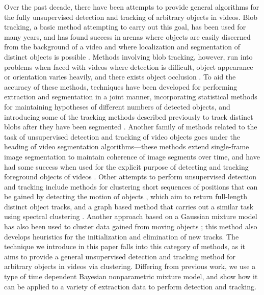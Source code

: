 \documentclass[twocolumn, final]{svjour3}
\begin{document}
Over the past decade, there have been attempts to provide general algorithms for the fully unsupervised detection and tracking of arbitrary objects in videos. Blob tracking, a basic method attempting to carry out this goal, has been used for many years, and has found success in arenas where objects are easily discerned from the background of a video and where localization and segmentation of distinct objects is possible \cite{francois2004real, isard_2001}. Methods involving blob tracking, however, run into problems when faced with videos where detection is difficult, object appearance or orientation varies heavily, and there exists object occlusion \cite{song2005model}. To aid the accuracy of these methods, techniques have been developed for performing extraction and segmentation in a joint manner, incorporating statistical methods for maintaining hypotheses of different numbers of detected objects, and introducing some of the tracking methods described previously to track distinct blobs after they have been segmented \cite{collins2003mean, isard_2001}. Another family of methods related to the task of unsupervised detection and tracking of video objects goes under the heading of video segmentation algorithms---these methods extend single-frame image segmentation to maintain coherence of image segments over time, and have had some success when used for the explicit purpose of detecting and tracking foreground objects of videos \cite{brox2003unsupervised, sista2000unsupervised, wang1998unsupervised}. Other attempts to perform unsupervised detection and tracking include methods for clustering short sequences of positions that can be gained by detecting the motion of objects \cite{brostow2006unsupervised, brox2010object}, which aim to return full-length distinct object tracks, and a graph based method that carries out a similar task using spectral clustering \cite{fragkiadaki2011detection}. Another approach based on a Gaussian mixture model has also been used to cluster data gained from moving objects \cite{pece_2002}; this method also develops heuristics for the initialization and elimination of new tracks. The technique we introduce in this paper falls into this category of methods, as it aims to provide a general unsupervised detection and tracking method for arbitrary objects in videos via clustering. Differing from previous work, we use a type of time dependent Bayesian nonparametric mixture model, and show how it can be applied to a variety of extraction data to perform detection and tracking.
\end{document}
